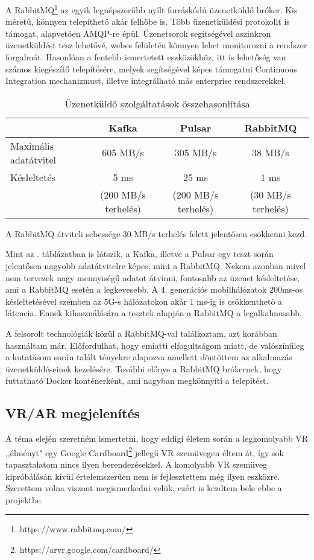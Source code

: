 \documentclass[11pt,a4paper,oneside]{article}
\begin{document}
A RabbitMQ\footnote{https://www.rabbitmq.com/} az egyik legnépszerűbb nyílt forráskódú üzenetküldő bróker. Kis méretű, könnyen telepíthető akár felhőbe is. Több üzenetküldési protokollt is támogat, alapvetően AMQP-re épül. Üzenetsorok segítségével aszinkron üzenetküldést tesz lehetővé, webes felületén könnyen lehet monitorozni a rendszer forgalmát. Hasonlóan a fentebb ismertetett eszközökhöz, itt is lehetőség van számos kiegészítő telepítésére, melyek segítségével képes támogatni Continuous Integration mechanizmust, illetve integrálható más enterprise rendszerekkel.

\begin{table}
  \caption{Üzenetküldő szolgáltatások összehasonlítása}
  \label{table:compare_brokers}
  \begin{tabular}{l|c|c|c}
    & Kafka & Pulsar & RabbitMQ\\
    \hline
    \hline
    Maximális adatátvitel & 605 MB/s & 305 MB/s & 38 MB/s \\
    \hline
    Késleltetés & 5 ms & 25 ms & 1 ms\\
    & (200 MB/s terhelés) & (200 MB/s terhelés) & (30 MB/s terhelés)
  \end{tabular}
  A RabbitMQ átviteli sebessége 30 MB/s terhelés felett jelentősen csökkenni kezd.
\end{table}

Mint az . táblázatban is látszik, a Kafka, illetve a Pulsar egy teszt során jelentősen nagyobb adatátvitelre képes, mint a RabbitMQ. Nekem azonban mivel nem tervezek nagy mennyiségű adatot átvinni, fontosabb az üzenet késleltetése, ami a RabbitMQ esetén a legkevesebb. A 4. generációs mobilhálózatok 200ms-os késleltetésével szemben az 5G-s hálózatokon akár 1 ms-ig is csökkenthető a látencia. Ennek kihasználására a tesztek alapján a RabbitMQ a legalkalmasabb.

A felsorolt technológiák közül a RabbitMQ-val találkoztam, azt korábban használtam már. Előfordulhat, hogy emiatti elfogultságom miatt, de valószínűleg a kutatásom során talált tényekre alapozva amellett döntöttem az alkalmazás üzenetküldéseinek kezelésére. További előnye a RabbitMQ brókernek, hogy futtatható Docker konténerként, ami nagyban megkönnyíti a telepítést.

\subsection{VR/AR megjelenítés}

A téma elején szeretném ismertetni, hogy eddigi életem során a legkomolyabb VR ,,élményt" egy Google Cardboard\footnote{https://arvr.google.com/cardboard/} jellegű VR szemüvegen éltem át, így sok tapasztalatom nincs ilyen berendezésekkel. A komolyabb VR szemüveg kipróbálásán kívül értelemszerűen nem is fejlesztettem még ilyen eszközre. Szerettem volna viszont megismerkedni velük, ezért is kezdtem bele ebbe a projektbe.
\end{document}
